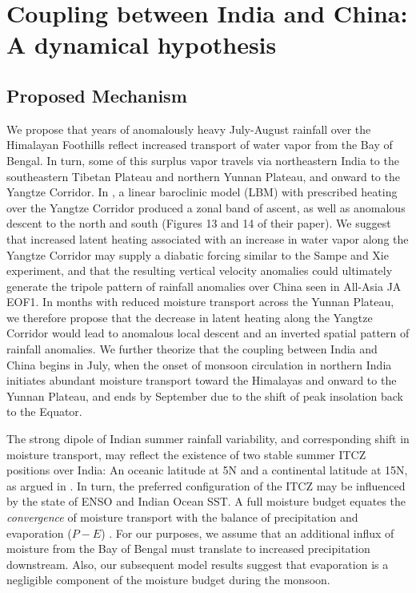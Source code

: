 \chapter{Coupling between India and China: A dynamical hypothesis}

\section{Proposed Mechanism}

	We propose that years of anomalously heavy July-August rainfall over the Himalayan Foothills reflect increased transport of water vapor from the Bay of Bengal. In turn, some of this surplus vapor travels via northeastern India to the southeastern Tibetan Plateau and northern Yunnan Plateau, and onward to the Yangtze Corridor. In \cite{Sampe2010}, a linear baroclinic model (LBM) with prescribed heating over the Yangtze Corridor produced a zonal band of ascent, as well as anomalous descent to the north and south (Figures 13 and 14 of their paper). We suggest that increased latent heating associated with an increase in water vapor along the Yangtze Corridor may supply a diabatic forcing similar to the Sampe and Xie experiment, and that the resulting vertical velocity anomalies could ultimately generate the tripole pattern of rainfall anomalies over China seen in All-Asia JA EOF1. In months with reduced moisture transport across the Yunnan Plateau, we therefore propose that the decrease in latent heating along the Yangtze Corridor would lead to anomalous local descent and an inverted spatial pattern of rainfall anomalies. We further theorize that the coupling between India and China begins in July, when the onset of monsoon circulation in northern India initiates abundant moisture transport toward the Himalayas and onward to the Yunnan Plateau, and ends by September due to the shift of peak insolation back to the Equator.
	
	The strong dipole of Indian summer rainfall variability, and corresponding shift in moisture transport, may reflect the existence of two stable summer ITCZ positions over India: An oceanic latitude at 5\textdegree N and a continental latitude at 15\textdegree N, as argued in \cite{Gadgil2003}. In turn, the preferred configuration of the ITCZ may be influenced by the state of ENSO and Indian Ocean SST. A full moisture budget equates the \textit{convergence} of moisture transport with the balance of precipitation and evaporation ($P-E$) \citep{Trenberth1991,Chen2014b}. For our purposes, we assume that an additional influx of moisture from the Bay of Bengal must translate to increased precipitation downstream. Also, our subsequent model results suggest that evaporation is a negligible component of the moisture budget during the monsoon.
		
